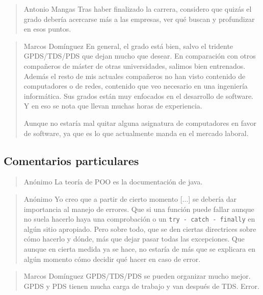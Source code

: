 \begin{quote}{Antonio Mangas}
    Tras haber finalizado la carrera,
    considero que quizás el grado debería acercarse más a las empresas,
    ver qué buscan y profundizar en esos puntos.
\end{quote}

\begin{quote}{Marcos Domínguez}\label{qte:marcos-contents}
    En general, el grado está bien,
    salvo el tridente GPDS/TDS/PDS que dejan mucho que desear.
    En comparación con otros compañeros de máster de otras universidades,
    salimos bien entrenados.
    Además el resto de mis actuales compañeros no han visto
    contenido de computadores o de redes,
    contenido que veo necesario en una ingeniería informática.
    Sus grados están muy enfocados en el desarrollo de software.
    Y en eso se nota que llevan muchas horas de experiencia.

    Aunque no estaría mal quitar alguna asignatura de computadores
    en favor de software,
    ya que es lo que actualmente manda en el mercado laboral.
\end{quote}

\subsection{Comentarios particulares}

\begin{quote}{Anónimo}
    La teoría de POO es la documentación de java.
\end{quote}

\begin{quote}{Anónimo}
    Yo creo que a partir de cierto momento [...]
    se debería dar importancia al manejo de errores.
    Que si una función puede fallar aunque no suela hacerlo
    haya una comprobación o un \lstinline{try - catch - finally}
    en algún sitio apropiado.
    Pero sobre todo, que se den ciertas directrices sobre cómo hacerlo y dónde,
    más que dejar pasar todas las excepciones.
    Que aunque en cierta medida ya se hace, no estaría de más que
    se explicara en algún momento cómo decidir qué hacer en caso de error.
\end{quote}

\begin{quote}{Marcos Domínguez}
    GPDS/TDS/PDS se pueden organizar mucho mejor.
    GPDS y PDS tienen mucha carga de trabajo y van después de TDS.
    Error.
\end{quote}

